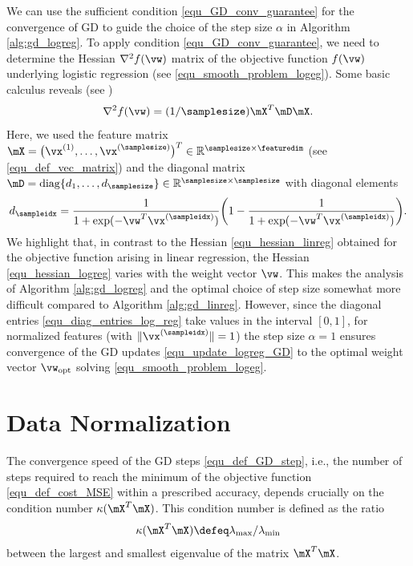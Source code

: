 \documentclass[12pt]{report}
\begin{document}
We can use the sufficient condition \eqref{equ_GD_conv_guarantee} for the convergence of GD 
to guide the choice of the step size $\alpha$ in Algorithm \ref{alg:gd_logreg}. To apply condition 
\eqref{equ_GD_conv_guarantee}, we need to determine the Hessian $\nabla^{2} f(\vw)$ matrix of the 
objective function $f(\vw)$ underlying logistic regression (see \eqref{equ_smooth_problem_logeg}). 
Some basic calculus reveals (see \cite[Ch. 4.4.]{hastie01statisticallearning})
\begin{equation}
\label{equ_hessian_logreg}
\nabla^{2} f(\vw) =  (1/\samplesize) \mX^{T} \mD \mX. 
\end{equation}
Here, we used the feature matrix $\mX=\big(\vx^{(1)},\ldots,\vx^{(\samplesize)}\big)^{T} \in \mathbb{R}^{\samplesize \times \featuredim}$ (see \eqref{equ_def_vec_matrix}) 
and the diagonal matrix $\mD = {\rm diag} \{d_{1},\ldots,d_{\samplesize}\} \in \mathbb{R}^{\samplesize \times \samplesize}$ with diagonal elements 
\begin{equation}
d_{\sampleidx} = \frac{1}{1+\exp(-\vw^{T} \vx^{(\sampleidx)})} \bigg(1- \frac{1}{1+\exp(-\vw^{T} \vx^{(\sampleidx)})}  \bigg). \label{equ_diag_entries_log_reg}   %
\end{equation} 
We highlight that, in contrast to the Hessian \eqref{equ_hessian_linreg} obtained for the objective function 
arising in linear regression, the Hessian \eqref{equ_hessian_logreg} varies with the weight vector $\vw$. 
This makes the analysis of Algorithm \ref{alg:gd_logreg} and the optimal choice of step size somewhat 
more difficult compared to Algorithm \ref{alg:gd_linreg}. However, since the diagonal entries \eqref{equ_diag_entries_log_reg} 
take values in the interval $[0,1]$, for normalized features (with $\| \vx^{(\sampleidx)} \|=1$) the step size $\alpha=1$ 
ensures convergence of the GD updates \eqref{equ_update_logreg_GD} to the optimal weight vector 
$\vw_{\rm opt}$ solving \eqref{equ_smooth_problem_logeg}. 

\section{Data Normalization} 

The convergence speed of the GD steps \eqref{equ_def_GD_step}, i.e., the 
number of steps required to reach the minimum of the objective function 
\eqref{equ_def_cost_MSE} within a prescribed accuracy, depends crucially 
on the condition number $\kappa( \mX^{T} \mX)$. This condition number is 
defined as the ratio 
\begin{equation}
\label{equ_def_condition_number} 
\kappa( \mX^{T} \mX) \defeq \lambda_{\rm max}/\lambda_{\rm min}
\end{equation} 
between the largest and smallest eigenvalue of the matrix $\mX^{T} \mX$. 
\end{document}
